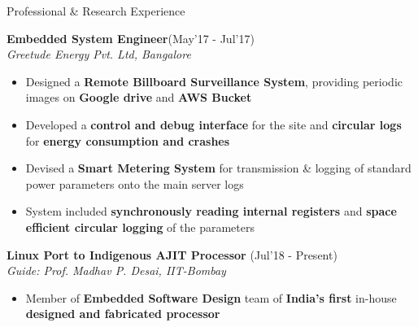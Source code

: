\documentclass{resume}
\newcommand{\sepval}{-0.5em}
\begin{document}
\begin{rSection}{Professional \& Research Experience}

\vspace{-.4cm}
 
\item{\bf {\bf Embedded System Engineer}}\hfill{(May'17 - Jul'17)}\\ \emph{Greetude Energy Pvt. Ltd, Bangalore}\\
[-0.4cm]
  
\begin{itemize}[leftmargin=*]
    
	\itemsep \sepval
 
	
	\item Designed a {\bf Remote Billboard Surveillance System}, providing periodic images on {\bf Google drive} and {\bf AWS Bucket}
	 
	\item Developed a {\bf control and debug interface} for the site and {\bf circular logs} for {\bf energy consumption and crashes}

	\item Devised a {\bf Smart Metering System} for transmission \& logging of standard power parameters onto the main server logs
 
	\item System included {\bf synchronously reading internal registers} and {\bf space efficient circular logging} of the parameters
	      
 
\end{itemize}

\vspace{-0.1cm}
\item {\bf{Linux Port to Indigenous AJIT Processor}} \hfill {(Jul'18 - Present)}\\

\emph{Guide: Prof. Madhav P. Desai, IIT-Bombay}\\
[-0.6cm]

\begin{itemize}[leftmargin=*]
		
	\itemsep \sepval

	\item Member of {\bf Embedded Software Design} team of {\bf India's first} in-house {\bf designed and fabricated processor}
	

\end{itemize}
\end{rSection}
\end{document}
